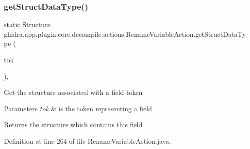 \subsubsection{\texorpdfstring{getStructDataType()}{getStructDataType()}}
{\footnotesize\ttfamily static Structure ghidra.\+app.\+plugin.\+core.\+decompile.\+actions.\+Rename\+Variable\+Action.\+get\+Struct\+Data\+Type (\begin{DoxyParamCaption}\item[{\mbox{\hyperlink{classghidra_1_1app_1_1decompiler_1_1_clang_token}{Clang\+Token}}}]{tok }\end{DoxyParamCaption})\hspace{0.3cm}{\ttfamily [inline]}, {\ttfamily [static]}}

Get the structure associated with a field token 
\begin{DoxyParams}{Parameters}
{\em tok} & is the token representing a field \\
\hline
\end{DoxyParams}
\begin{DoxyReturn}{Returns}
the structure which contains this field 
\end{DoxyReturn}


Definition at line 264 of file Rename\+Variable\+Action.\+java.


